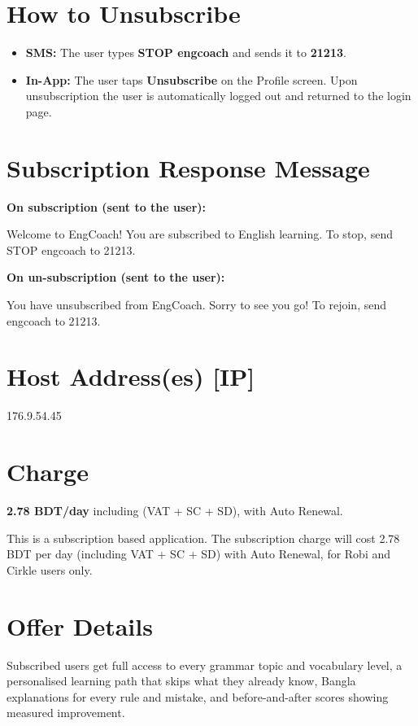 \documentclass[11pt,a4paper]{article}
\newcommand{\msg}[1]{\par\vspace{2pt}\colorbox{panel}{\parbox{\dimexpr\linewidth-2\fboxsep}{#1}}\vspace{4pt}}
\begin{document}
\section{How to Unsubscribe}
\begin{itemize}
  \item \textbf{SMS:} The user types \textbf{STOP engcoach} and sends it to \textbf{21213}.
  \item \textbf{In-App:} The user taps \textbf{Unsubscribe} on the Profile screen. Upon
        unsubscription the user is automatically logged out and returned to the login page.
\end{itemize}

\section{Subscription Response Message}
\textbf{On subscription (sent to the user):}
\msg{Welcome to EngCoach! You are subscribed to English learning. To stop, send
STOP engcoach to 21213.}

\textbf{On un-subscription (sent to the user):}
\msg{You have unsubscribed from EngCoach. Sorry to see you go! To rejoin, send
engcoach to 21213.}

\section{Host Address(es) [IP]}
176.9.54.45

\section{Charge}
\textbf{2.78 BDT/day} including (VAT + SC + SD), with Auto Renewal.

This is a subscription based application. The subscription charge will cost 2.78 BDT
per day (including VAT + SC + SD) with Auto Renewal, for Robi and Cirkle users only.

\section{Offer Details}
Subscribed users get full access to every grammar topic and vocabulary level, a
personalised learning path that skips what they already know, Bangla explanations for
every rule and mistake, and before-and-after scores showing measured improvement.
\end{document}
